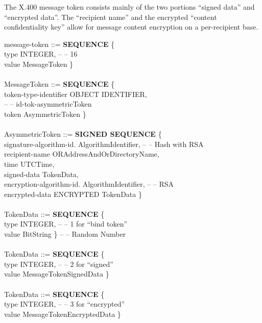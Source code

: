 The X.400 message token consists
mainly of the two portions ``signed data'' and ``encrypted data''.
The ``recipient name'' and the encrypted ``content confidentiality key''
allow for message content encryption on a per-recipient base.

{\small
\btab
\1 message-token ::= {\bf SEQUENCE} \{ \\
\2 type  \3 [0] INTEGER, -- -- 16 \\
\2 value \3 [2] MessageToken \} \\
\\
\1 MessageToken ::= {\bf SEQUENCE} \{ \\
\2 token-type-identifier \3 [0] OBJECT IDENTIFIER, \\
\2                       \3 -- -- id-tok-asymmetricToken \\
\2 token \3 [1] AsymmetricToken \} \\
\\
\1 AsymmetricToken ::= {\bf SIGNED SEQUENCE} \{  \\
\2 signature-algorithm-id. \3 AlgorithmIdentifier, -- -- Hash with RSA \\
\2 recipient-name \3 ORAddressAndOrDirectoryName, \\
\2 time  \3 UTCTime, \\
\2 signed-data \3 [0] TokenData, \\
\2 encryption-algorithm-id. \3 [1] AlgorithmIdentifier, -- -- RSA \\
\2 encrypted-data \3 [2] ENCRYPTED TokenData \} \\
\\
\etab
}
{\small
\btab
\1 TokenData ::= {\bf SEQUENCE} \{ \\
\2 type  \3 [0] INTEGER, -- -- 1 for ``bind token'' \\
\2 value \3 [1] BitString \} -- -- Random Number \\
\\
\1 TokenData ::= {\bf SEQUENCE} \{ \\
\2 type  \3 [0] INTEGER, -- -- 2 for ``signed'' \\
\2 value \3 [1] MessageTokenSignedData  \} \\
\\
\1 TokenData ::= {\bf SEQUENCE} \{ \\
\2 type  \3 [0] INTEGER, -- -- 3 for ``encrypted'' \\
\2 value \3 [1] MessageTokenEncryptedData  \} \\
\\
\etab
}
